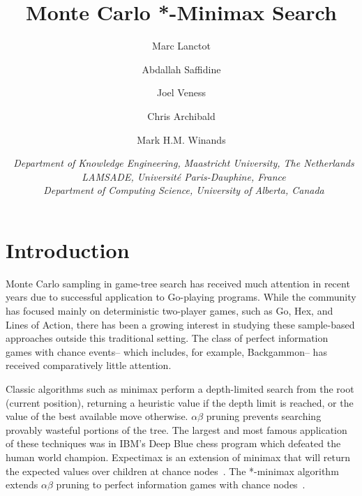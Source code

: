 \documentclass{article}
\title{\textbf{\huge Monte Carlo *-Minimax Search\footnotemark[1]}}
\author{Marc Lanctot\affila \and
        Abdallah Saffidine\affilb \and
        Joel Veness\affilc \and
        Chris Archibald\affilc \and 
        Mark H.M. Winands\affila}
\date{\small \affila\ \textit{Department of Knowledge Engineering, Maastricht University, The Netherlands}\\
      \affilb\ \textit{LAMSADE, Universit\'{e} Paris-Dauphine, France}\\
      \affilc\ \textit{Department of Computing Science, University of Alberta, Canada}}
\begin{document}
\ttl
\thispagestyle{empty}





\section{Introduction}

Monte Carlo sampling in game-tree search has received much attention in recent years due to successful application to 
Go-playing programs. 
While the community has focused mainly on deterministic two-player games, such as Go, Hex, and Lines of Action, there
has been a growing interest in studying these sample-based approaches outside this traditional setting. The class of 
perfect information games with chance events-- which includes, for example, Backgammon-- has received comparatively 
little attention. 

Classic algorithms such as minimax perform a depth-limited search from the root (current position), 
returning a heuristic value if the depth limit is reached, or the value of the best available move otherwise.  
$\alpha \beta$ pruning prevents searching provably wasteful portions of the tree. The largest 
and most famous application of these techniques was in IBM's Deep Blue chess program which defeated the human world 
champion. Expectimax is an extension of minimax that will return the expected values over children at 
chance nodes~\cite{Michie66Exp}. The *-minimax algorithm extends $\alpha \beta$ pruning to perfect information games with 
chance nodes~\cite{Ballard83}. 
\end{document}
